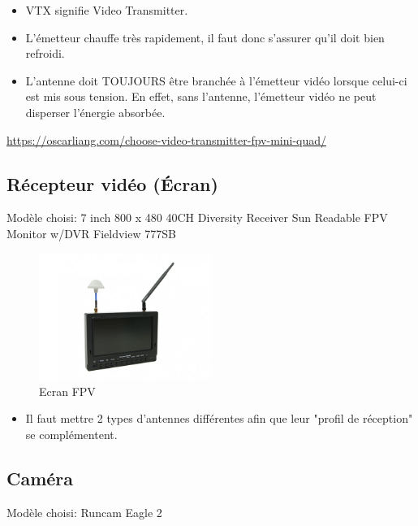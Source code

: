 \documentclass[a4paper, 11pt]{report}
\begin{document}
\begin{itemize}
\item VTX signifie Video Transmitter.
\item L'émetteur  chauffe très rapidement, il faut donc s'assurer qu'il doit bien refroidi.
\item L'antenne doit TOUJOURS être branchée à l'émetteur vidéo lorsque celui-ci est mis sous tension. En effet, sans l'antenne, l'émetteur vidéo ne peut disperser l'énergie absorbée.
\end{itemize}

\url{https://oscarliang.com/choose-video-transmitter-fpv-mini-quad/}

\subsection{Récepteur vidéo (Écran)}
Modèle choisi: 7 inch 800 x 480 40CH Diversity Receiver Sun Readable FPV Monitor w/DVR Fieldview 777SB

\begin{figure}[h]
	\begin{center}
		\includegraphics[width=0.5\textwidth]{images/ecran.jpg}
		\caption{Ecran FPV}
	\end{center}
\end{figure}

\begin{itemize}
\item Il faut mettre 2 types d'antennes différentes afin que leur "profil de réception" se complémentent.
\end{itemize}

\subsection{Caméra}
Modèle choisi: Runcam Eagle 2
\end{document}
